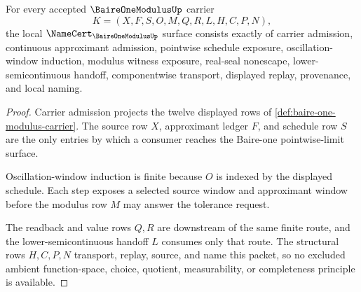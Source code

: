 \begin{theorem}
\label{thm:baire-one-modulus-obligations}
For every accepted $\BaireOneModulusUp$ carrier
$$
K=(X,F,S,O,M,Q,R,L,H,C,P,N),
$$
the local $\NameCert_{\BaireOneModulusUp}$ surface consists exactly of carrier admission, continuous approximant admission, pointwise schedule exposure, oscillation-window induction, modulus witness exposure, real-seal nonescape, lower-semicontinuous handoff, componentwise transport, displayed replay, provenance, and local naming.
\end{theorem}
\begin{proof}
Carrier admission projects the twelve displayed rows of \autoref{def:baire-one-modulus-carrier}. The source row $X$, approximant ledger $F$, and schedule row $S$ are the only entries by which a consumer reaches the Baire-one pointwise-limit surface.

Oscillation-window induction is finite because $O$ is indexed by the displayed schedule. Each step exposes a selected source window and approximant window before the modulus row $M$ may answer the tolerance request.

The readback and value rows $Q,R$ are downstream of the same finite route, and the lower-semicontinuous handoff $L$ consumes only that route. The structural rows $H,C,P,N$ transport, replay, source, and name this packet, so no excluded ambient function-space, choice, quotient, measurability, or completeness principle is available.
\end{proof}



